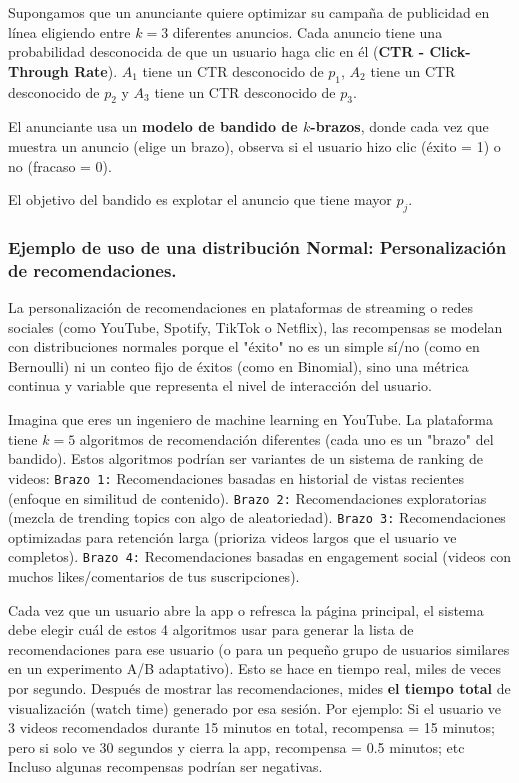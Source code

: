 \documentclass[a4paper, 11pt]{article}
\begin{document}
Supongamos que un anunciante quiere optimizar su campaña de publicidad en línea eligiendo entre \( k = 3 \) diferentes anuncios. Cada anuncio tiene una probabilidad desconocida de que un usuario haga clic en él (\textbf{CTR - Click-Through Rate}). \( A_1 \) tiene un CTR desconocido de \( p_1 \), \( A_2 \) tiene un CTR desconocido de \( p_2 \) y \( A_3 \) tiene un CTR desconocido de \( p_3 \).

El anunciante usa un \textbf{modelo de bandido de \( k \)-brazos}, donde cada vez que muestra un anuncio (elige un brazo), observa si el usuario hizo clic (éxito = 1) o no (fracaso = 0).

El objetivo del bandido es explotar el anuncio que tiene mayor $p_j$.


\subsubsection*{Ejemplo de uso de una distribución Normal: Personalización de recomendaciones.}

La personalización de recomendaciones en plataformas de streaming o redes sociales (como YouTube, Spotify, TikTok o Netflix), las recompensas se modelan con distribuciones normales porque el "éxito" no es un simple sí/no (como en Bernoulli) ni un conteo fijo de éxitos (como en Binomial), sino una métrica continua y variable que representa el nivel de interacción del usuario. 

Imagina que eres un ingeniero de machine learning en YouTube. La plataforma tiene $k = 5$ algoritmos de recomendación diferentes (cada uno es un "brazo" del bandido). Estos algoritmos podrían ser variantes de un sistema de ranking de videos:
\texttt{Brazo 1:} Recomendaciones basadas en historial de vistas recientes (enfoque en similitud de contenido).
\texttt{Brazo 2:} Recomendaciones exploratorias (mezcla de trending topics con algo de aleatoriedad).
\texttt{Brazo 3:} Recomendaciones optimizadas para retención larga (prioriza videos largos que el usuario ve completos).
\texttt{Brazo 4:} Recomendaciones basadas en engagement social (videos con muchos likes/comentarios de tus suscripciones).

Cada vez que un usuario abre la app o refresca la página principal, el sistema debe elegir cuál de estos 4 algoritmos usar para generar la lista de recomendaciones para ese usuario (o para un pequeño grupo de usuarios similares en un experimento A/B adaptativo). Esto se hace en tiempo real, miles de veces por segundo.
Después de mostrar las recomendaciones, mides \textbf{el tiempo total} de visualización (watch time) generado por esa sesión. Por ejemplo: Si el usuario ve 3 videos recomendados durante 15 minutos en total, recompensa = 15 minutos; pero si solo ve 30 segundos y cierra la app, recompensa = 0.5 minutos; etc Incluso algunas recompensas podrían ser negativas.
\end{document}
